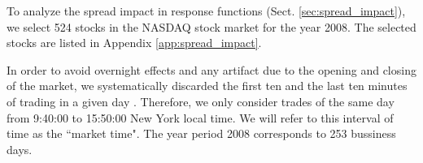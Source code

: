To analyze the spread impact in response functions (Sect.
\ref{sec:spread_impact}), we select 524 stocks in the NASDAQ stock market for
the year 2008. The selected stocks are listed in Appendix
\ref{app:spread_impact}.

In order to avoid overnight effects and any artifact due to the opening and
closing of the market, we systematically discarded the first ten and the last
ten minutes of trading in a given day
\cite{Bouchaud_2004,large_prices_changes,spread_changes_affect,Wang_2016_cross}.
Therefore, we only consider trades of the same day from 9:40:00 to 15:50:00
New York local time. We will refer to this interval of time as the ``market
time". The year period 2008 corresponds to 253 bussiness days.
